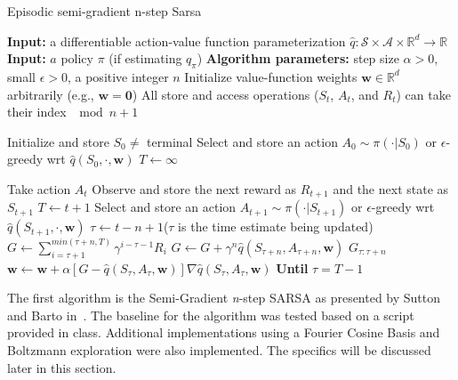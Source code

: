 \documentclass[journal]{IEEEtran}
\begin{document}
\begin{algorithm}
    \caption{Episodic semi-gradient n-step Sarsa~\cite{sutton2018}}
    \label{alg:semi-grad_sarsa}
    \begin{algorithmic}\small
      \State \textbf{Input:} a differentiable action-value function parameterization 
      \(\hat{q}:\mathcal{S} \times \mathcal{A} \times \mathbb{R}^d \rightarrow \mathbb{R}\)
      \State \textbf{Input:} \(a\) policy \(\pi\) (if estimating \(q_\pi\)) 
      \State \textbf{Algorithm parameters:} step size \(\alpha>0\), small \(\epsilon>0\), 
          a positive integer \(n\)
      \State Initialize value-function weights \(\mathbf{w} \in \mathbb{R}^d\) arbitrarily 
          (e.g., \(\mathbf{w} = \mathbf{0}\)) 
      \State All store and access operations (\(S_t\), \(A_t\), and \(R_t\)) 
          can take their index \(\mod n+1\)

        \State Initialize and store \(S_0\neq\) terminal
        \State Select and store an action \(A_0\sim\pi(\cdot|S_0)\) 
        \State \quad or \(\epsilon\)-greedy wrt \(\hat{q}(S_0,\cdot,\mathbf{w})\)
        \State \(T\leftarrow\infty\)

            \State Take action \(A_t\) 
            \State Observe and store the next reward as \(R_{t+1}\) 
            \State \quad and the next state as \(S_{t+1}\)
              \State \(T \leftarrow t+1\)
            \Else
              \State Select and store an action \(A_{t+1}\sim\pi(\cdot|S_{t+1})\) or 
              \State \quad \(\epsilon\)-greedy wrt \(\hat{q}(S_{t+1},\cdot,\mathbf{w})\)
            \EndIf
            \State \(\tau \leftarrow t-n+1\)\qquad (\(\tau\) is the time estimate being updated)
          \EndIf
            \State \(G \leftarrow \sum^{min(\tau+n,T)}_{i=\tau+1}\gamma^{i-\tau-1}R_i \)
              \State\(G\leftarrow G+\gamma^n \hat{q}(S_{\tau+n},A_{\tau+n},\mathbf{w})\)
              \Comment \(G_{\tau:\tau+n}\)
            \EndIf
            \State \(\mathbf{w}\leftarrow\mathbf{w}+\alpha[G-\hat{q}(S_\tau,A_\tau,\mathbf{w})] 
                \nabla\hat{q}(S_\tau,A_\tau,\mathbf{w})\)
          \EndIf
        \EndFor
        \State \textbf{Until} \(\tau = T-1\)
      \EndFor
    \end{algorithmic}
\end{algorithm}

The first algorithm is the Semi-Gradient \emph{n}-step SARSA as presented by Sutton and Barto
in~\cite{sutton2018}. 
The baseline for the algorithm was tested based on a script provided in class.
Additional implementations using a Fourier Cosine Basis and Boltzmann exploration were 
also implemented. The specifics will be discussed later in this section.
\end{document}
